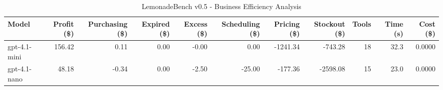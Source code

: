 \begin{table}[h]
\centering
\caption{LemonadeBench v0.5 - Business Efficiency Analysis}
\label{tab:lemonadebench_v05_efficiency}
\begin{tabular}{|l|r|r|r|r|r|r|r|r|r|r|}
\hline
\textbf{Model} & \textbf{Profit (\$)} & \textbf{Purchasing (\$)} & \textbf{Expired (\$)} & \textbf{Excess (\$)} & \textbf{Scheduling (\$)} & \textbf{Pricing (\$)} & \textbf{Stockout (\$)} & \textbf{Tools} & \textbf{Time (s)} & \textbf{Cost (\$)} \\
\hline
gpt-4.1-mini & 156.42 & 0.11 & 0.00 & -0.00 & 0.00 & -1241.34 & -743.28 & 18 & 32.3 & 0.0000 \\
\hline
gpt-4.1-nano & 48.18 & -0.34 & 0.00 & -2.50 & -25.00 & -177.36 & -2598.08 & 15 & 23.0 & 0.0000 \\
\hline
\end{tabular}
\end{table}